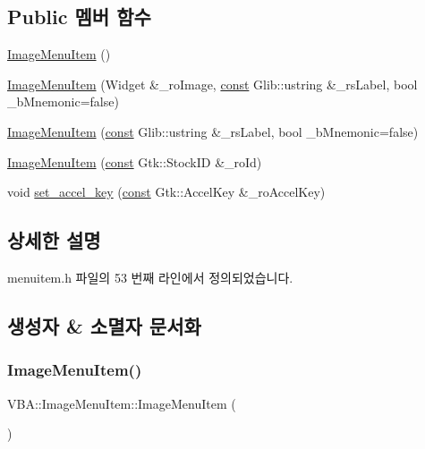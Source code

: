 \subsection*{Public 멤버 함수}
\begin{DoxyCompactItemize}
\item 
\mbox{\hyperlink{class_v_b_a_1_1_image_menu_item_a3068604a06c803d7dc6592eb2b0a0184}{Image\+Menu\+Item}} ()
\item 
\mbox{\hyperlink{class_v_b_a_1_1_image_menu_item_a52aaf1e5ccc5520a9136f113ee69c47b}{Image\+Menu\+Item}} (Widget \&\+\_\+ro\+Image, \mbox{\hyperlink{getopt1_8c_a2c212835823e3c54a8ab6d95c652660e}{const}} Glib\+::ustring \&\+\_\+rs\+Label, bool \+\_\+b\+Mnemonic=false)
\item 
\mbox{\hyperlink{class_v_b_a_1_1_image_menu_item_a3cc1d64f1275f7e31c6cf1d48a21c070}{Image\+Menu\+Item}} (\mbox{\hyperlink{getopt1_8c_a2c212835823e3c54a8ab6d95c652660e}{const}} Glib\+::ustring \&\+\_\+rs\+Label, bool \+\_\+b\+Mnemonic=false)
\item 
\mbox{\hyperlink{class_v_b_a_1_1_image_menu_item_a3b7e700a518ea938513b80817662b1d1}{Image\+Menu\+Item}} (\mbox{\hyperlink{getopt1_8c_a2c212835823e3c54a8ab6d95c652660e}{const}} Gtk\+::\+Stock\+ID \&\+\_\+ro\+Id)
\item 
void \mbox{\hyperlink{class_v_b_a_1_1_image_menu_item_a709d7e9ac328ac7d53f576caf804398b}{set\+\_\+accel\+\_\+key}} (\mbox{\hyperlink{getopt1_8c_a2c212835823e3c54a8ab6d95c652660e}{const}} Gtk\+::\+Accel\+Key \&\+\_\+ro\+Accel\+Key)
\end{DoxyCompactItemize}


\subsection{상세한 설명}


menuitem.\+h 파일의 53 번째 라인에서 정의되었습니다.



\subsection{생성자 \& 소멸자 문서화}
\mbox{\label{class_v_b_a_1_1_image_menu_item_a3068604a06c803d7dc6592eb2b0a0184}} 
\subsubsection{\texorpdfstring{Image\+Menu\+Item()}{ImageMenuItem()}\hspace{0.1cm}{\footnotesize\ttfamily [1/4]}}
{\footnotesize\ttfamily V\+B\+A\+::\+Image\+Menu\+Item\+::\+Image\+Menu\+Item (\begin{DoxyParamCaption}{ }\end{DoxyParamCaption})\hspace{0.3cm}{\ttfamily [inline]}}



